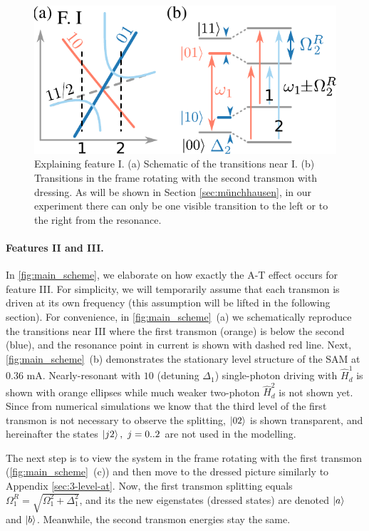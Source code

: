 \documentclass[%
 aip,
 amsmath,amssymb,
 reprint,%
]{revtex4-1}
\begin{document}
\begin{figure}
	\label{fig:main_scheme}
\end{figure}

\begin{figure}
	\includegraphics[width=.9\linewidth]{topo_scheme}
	\caption{Explaining feature I. (a) Schematic of the transitions near I. (b) Transitions in the frame rotating with the second transmon with dressing. As will be shown in Section \ref{sec:münchhausen}, in our experiment there can only be one visible transition to the left or to the right from the resonance.}
	\label{fig:featureI}
\end{figure} 

\paragraph{Features II and III.}  

In \autoref{fig:main_scheme}, we elaborate on how exactly the A-T effect occurs for feature III. For simplicity, we will temporarily assume that each transmon is driven at its own frequency (this assumption will be lifted in the following section). For convenience, in \autoref{fig:main_scheme}~(a) we schematically reproduce the transitions near III where the first transmon (orange) is below the second (blue), and the resonance point in current is shown with dashed red line. Next, \autoref{fig:main_scheme}~(b) demonstrates the stationary level structure of the SAM at 0.36 mA. Nearly-resonant with $10$ (detuning $\Delta_1$) single-photon driving with $\hat H_d^1$ is shown with orange ellipses while much weaker two-photon $\hat H_d^2$ is not shown yet. Since from numerical simulations we know that the third level of the first transmon is not necessary to observe the splitting, $\ket{02}$ is shown transparent, and hereinafter the states $\ket{j2},\ j=0..2$ are not used in the modelling.

The next step is to view the system in the frame rotating with the first transmon (\autoref{fig:main_scheme}~(c)) and then move to the  dressed picture similarly to Appendix \ref{sec:3-level-at}. Now, the first transmon splitting equals $\Omega_{1}^R = \sqrt{\Omega_1^2+\Delta_1^2}$, and its the new eigenstates (dressed states) are denoted $\ket{a}$ and $\ket{b}$. Meanwhile, the second transmon energies stay the same.
\end{document}
